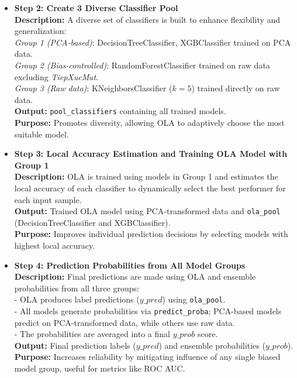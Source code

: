 \documentclass[conference]{IEEEtran}
\begin{document}
\begin{enumerate}
\begin{itemize}
\item \textbf{Step 2: Create 3 Diverse Classifier Pool}~\\
\textbf{Description:} A diverse set of classifiers is built to enhance flexibility and generalization:\\
\textit{Group 1 (PCA-based)}: DecisionTreeClassifier, XGBClassifier trained on PCA data.\\
\textit{Group 2 (Bias-controlled)}: RandomForestClassifier trained on raw data excluding \textit{TiepXucMat}.\\
\textit{Group 3 (Raw data)}: KNeighborsClassifier ($k=5$) trained directly on raw data.\\
\textbf{Output:} \texttt{pool\_classifiers} containing all trained models.\\
\textbf{Purpose:} Promotes diversity, allowing OLA to adaptively choose the most suitable model.

\item \textbf{Step 3: Local Accuracy Estimation and Training OLA Model with Group 1}~\\
\textbf{Description:} OLA is trained using models in Group 1 and estimates the local accuracy of each classifier to dynamically select the best performer for each input sample.\\
\textbf{Output:} Trained OLA model using PCA-transformed data and \texttt{ola\_pool} (DecisionTreeClassifier and XGBClassifier).\\
\textbf{Purpose:} Improves individual prediction decisions by selecting models with highest local accuracy.

\item \textbf{Step 4: Prediction Probabilities from All Model Groups}~\\
\textbf{Description:} Final predictions are made using OLA and ensemble probabilities from all three groups:\\
- OLA produces label predictions ($y\_pred$) using \texttt{ola\_pool}.\\
- All models generate probabilities via \texttt{predict\_proba}; PCA-based models predict on PCA-transformed data, while others use raw data.\\
- The probabilities are averaged into a final $y\_prob$ score.\\
\textbf{Output:} Final prediction labels ($y\_pred$) and ensemble probabilities ($y\_prob$).\\
\textbf{Purpose:} Increases reliability by mitigating influence of any single biased model group, useful for metrics like ROC AUC.
\end{itemize}
\end{enumerate}
\end{document}
